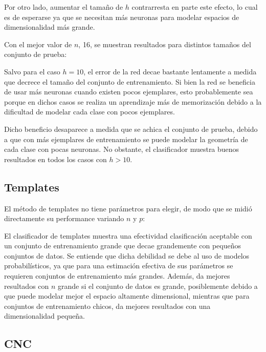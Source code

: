 Por otro lado, aumentar el tamaño de $h$ contrarresta en parte este efecto, lo cual es de esperarse ya que se necesitan más neuronas para modelar espacios de dimensionalidad más grande.

Con el mejor valor de $n$, 16, se muestran resultados para distintos tamaños del conjunto de prueba:


Salvo para el caso $h=10$, el error de la red decae bastante lentamente a medida que decrece el tamaño del conjunto de entrenamiento. Si bien la red se beneficia de usar más neuronas cuando existen pocos ejemplares, esto probablemente sea porque en dichos casos se realiza un aprendizaje más de memorización debido a la dificultad de modelar cada clase con pocos ejemplares. 

Dicho beneficio desaparece a medida que se achica el conjunto de prueba, debido a que con más ejemplares de entrenamiento se puede modelar la geometría de cada clase con pocas neuronas. No obstante, el clasificador muestra buenos resultados en todos los casos con $h>10$. 

\subsection{Templates}
El método de templates no tiene parámetros para elegir, de modo que se midió directamente su performance variando $n$ y $p$:


El clasificador de templates muestra una efectividad clasificación aceptable con un conjunto de entrenamiento grande que decae grandemente con pequeños conjuntos de datos. Se entiende que dicha debilidad se debe al uso de modelos probabilísticos, ya que para una estimación efectiva de sus parámetros se requieren conjuntos de entrenamiento más grandes. 
Además, da mejores resultados con $n$ grande si el conjunto de datos es grande, posiblemente debido a que puede modelar mejor el espacio altamente dimensional, mientras que para conjuntos de entrenamiento chicos, da mejores resultados con una dimensionalidad pequeña.

\subsection{CNC}

